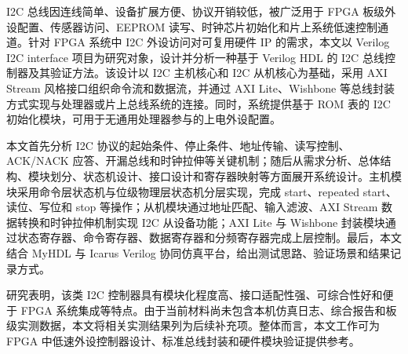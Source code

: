 I2C 总线因连线简单、设备扩展方便、协议开销较低，被广泛用于 FPGA
板级外设配置、传感器访问、EEPROM
读写、时钟芯片初始化和片上系统低速控制通道。针对 FPGA 系统中 I2C
外设访问对可复用硬件 IP 的需求，本文以 Verilog I2C interface
项目为研究对象，设计并分析一种基于 Verilog HDL 的 I2C
总线控制器及其验证方法。该设计以 I2C 主机核心和 I2C 从机核心为基础，采用
AXI Stream 风格接口组织命令流和数据流，并通过 AXI Lite、Wishbone
等总线封装方式实现与处理器或片上总线系统的连接。同时，系统提供基于 ROM
表的 I2C 初始化模块，可用于无通用处理器参与的上电外设配置。

本文首先分析 I2C 协议的起始条件、停止条件、地址传输、读写控制、ACK/NACK
应答、开漏总线和时钟拉伸等关键机制；随后从需求分析、总体结构、模块划分、状态机设计、接口设计和寄存器映射等方面展开系统设计。主机模块采用命令层状态机与位级物理层状态机分层实现，完成
start、repeated start、读位、写位和 stop
等操作；从机模块通过地址匹配、输入滤波、AXI Stream
数据转换和时钟拉伸机制实现 I2C 从设备功能；AXI Lite 与 Wishbone
封装模块通过状态寄存器、命令寄存器、数据寄存器和分频寄存器完成上层控制。最后，本文结合
MyHDL 与 Icarus Verilog
协同仿真平台，给出测试思路、验证场景和结果记录方式。

研究表明，该类 I2C
控制器具有模块化程度高、接口适配性强、可综合性好和便于 FPGA
系统集成等特点。由于当前材料尚未包含本机仿真日志、综合报告和板级实测数据，本文将相关实测结果列为后续补充项。整体而言，本文工作可为
FPGA 中低速外设控制器设计、标准总线封装和硬件模块验证提供参考。
